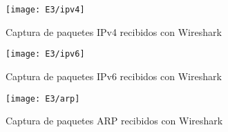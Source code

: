 \begin{figure}[h!] 
\centering    
\texttt{[image: E3/ipv4]}
\caption[Captura de paquetes IPv4 recibidos con Wireshark]{Captura de paquetes IPv4 recibidos con Wireshark}
\label{fig:CapturaTCP}
\end{figure}

\newpage
\begin{figure}[ht!] 
\centering    
\texttt{[image: E3/ipv6]}
\caption[Captura de paquetes IPv6 recibidos con Wireshark]{Captura de paquetes IPv6 recibidos con Wireshark}
\label{fig:CapturaTCP}
\end{figure}

\begin{figure}[h!] 
\centering    
\texttt{[image: E3/arp]}
\caption[Captura de paquetes ARP recibidos con Wireshark]{Captura de paquetes ARP recibidos con Wireshark}
\label{fig:CapturaTCP}
\end{figure}